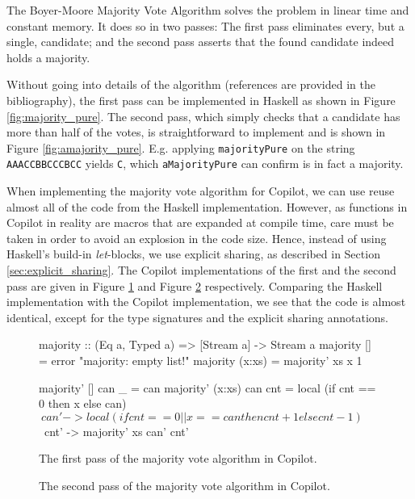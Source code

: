 \documentclass[]{article}
\theoremstyle{example}
\begin{document}
The Boyer-Moore Majority Vote Algorithm \citep{MooreBoyer82, Hesselink2005}
solves the problem in linear time and constant memory. It does so in two passes:
The first pass eliminates every, but a single, candidate; and the second pass
asserts that the found candidate indeed holds a majority.

Without going into details of the algorithm (references are provided in the
bibliography), the first pass can be implemented in Haskell as shown in Figure
\ref{fig:majority_pure}. The second pass, which simply checks that a candidate
has more than half of the votes, is straightforward to implement and is shown
in Figure \ref{fig:amajority_pure}.
E.g. applying {\tt majorityPure} on the string {\tt AAACCBBCCCBCC} yields
{\tt C}, which {\tt aMajorityPure} can confirm is in fact a majority.

When implementing the majority vote algorithm for Copilot, we can use reuse
almost all of the code from the Haskell implementation. However, as functions
in Copilot in reality are macros that are expanded at compile time, care must
be taken in order to avoid an explosion in the code size. Hence, instead of
using Haskell's build-in \emph{let}-blocks, we use explicit sharing, as
described in Section \ref{sec:explicit_sharing}. The Copilot implementations
of the first and the second pass are given in Figure \ref{fig:majority} and
Figure \ref{fig:amajority} respectively. Comparing the Haskell implementation
with the Copilot implementation, we see that the code is almost identical,
except for the type signatures and the explicit sharing annotations.

\begin{figure}
\begin{code}
majority :: (Eq a, Typed a) => [Stream a] -> Stream a
majority []     = error "majority: empty list!"
majority (x:xs) = majority' xs x 1

majority' []     can _   = can
majority' (x:xs) can cnt =
  local
    (if cnt == 0 then x else can) $
      \ can' ->
        local (if cnt == 0 || x == can then cnt+1 else cnt-1) $
          \ cnt' ->
            majority' xs can' cnt'
\end{code}
\caption{The first pass of the majority vote algorithm in Copilot.}
\label{fig:majority}
\end{figure}

\begin{figure}
\caption{The second pass of the majority vote algorithm in Copilot.}
\label{fig:amajority}
\end{figure}
\end{document}
